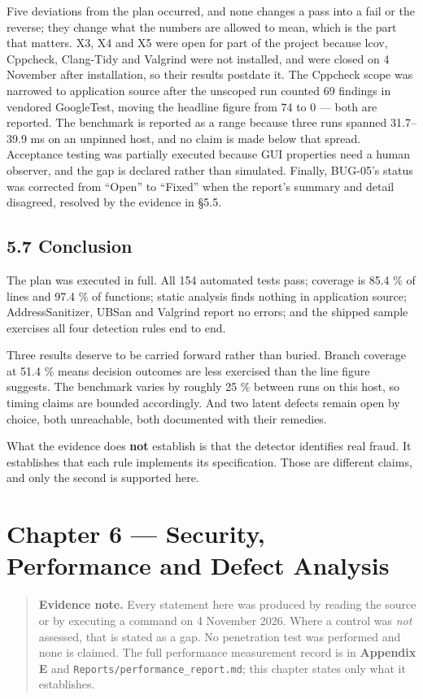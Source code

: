 \documentclass[
  12pt,
]{report}
\begin{document}
Five deviations from the plan occurred, and none changes a pass into a
fail or the reverse; they change what the numbers are allowed to mean,
which is the part that matters. X3, X4 and X5 were open for part of the
project because lcov, Cppcheck, Clang-Tidy and Valgrind were not
installed, and were closed on 4 November after installation, so their
results postdate it. The Cppcheck scope was narrowed to application
source after the unscoped run counted 69 findings in vendored
GoogleTest, moving the headline figure from 74 to 0 --- both are
reported. The benchmark is reported as a range because three runs
spanned 31.7--39.9 ms on an unpinned host, and no claim is made below
that spread. Acceptance testing was partially executed because GUI
properties need a human observer, and the gap is declared rather than
simulated. Finally, BUG-05's status was corrected from ``Open'' to
``Fixed'' when the report's summary and detail disagreed, resolved by
the evidence in §5.5.

\section{5.7 Conclusion}\label{conclusion}

The plan was executed in full. All 154 automated tests pass; coverage is
85.4 \% of lines and 97.4 \% of functions; static analysis finds nothing
in application source; Address\-Sanitizer, UBSan and Valgrind report no
errors; and the shipped sample exercises all four detection rules end to
end.

Three results deserve to be carried forward rather than buried. Branch
coverage at 51.4 \% means decision outcomes are less exercised than the
line figure suggests. The benchmark varies by roughly 25 \% between runs
on this host, so timing claims are bounded accordingly. And two latent
defects remain open by choice, both unreachable, both documented with
their remedies.

What the evidence does \textbf{not} establish is that the detector
identifies real fraud. It establishes that each rule implements its
specification. Those are different claims, and only the second is
supported here.

\chapter{Chapter 6 --- Security, Performance and Defect
Analysis}\label{chapter-6-security-performance-and-defect-analysis}

\begin{quote}
\textbf{Evidence note.} Every statement here was produced by reading the
source or by executing a command on 4 November 2026. Where a control was
\emph{not} assessed, that is stated as a gap. No penetration test was
performed and none is claimed. The full performance measurement record
is in \textbf{Appendix E} and \texttt{Reports/\allowbreak{}performance\_report.md};
this chapter states only what it establishes.
\end{quote}
\end{document}
